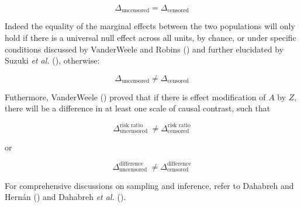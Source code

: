 \documentclass[
  singlecolumn]{article}
\begin{document}
\[\Delta_{\text{uncensored}} = \Delta_{\text{censored}}\]

Indeed the equality of the marginal effects between the two populations
will only hold if there is a universal null effect across all units, by
chance, or under specific conditions discussed by VanderWeele and Robins
() and further elucidated by Suzuki
\emph{et al.} (),
otherwise:

\[\Delta_{\text{uncensored}} \ne \Delta_{\text{censored}}\]

Futhermore, VanderWeele () proved
that if there is effect modification of \(A\) by \(Z\), there will be a
difference in at least one scale of causal contrast, such that

\[\Delta^{\text{risk ratio}}_{\text{uncensored }}  \ne \Delta^{\text{risk ratio}}_{\text{censored}}\]

or

\[\Delta^{\text{difference}}_{\text{uncensored }}  \ne \Delta^{\text{difference}}_{\text{censored}}\]

For comprehensive discussions on sampling and inference, refer to
Dahabreh and Hernán () and Dahabreh
\emph{et al.} ().
\end{document}
